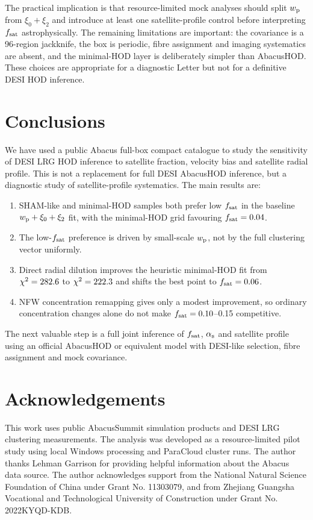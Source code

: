 \documentclass[fleqn,usenatbib]{mnras}
\newcommand{\fsat}{f_{\rm sat}}
\newcommand{\alphas}{\alpha_{\rm s}}
\newcommand{\wproj}{w_{\rm p}}
\newcommand{\xizero}{\xi_0}
\newcommand{\xitwo}{\xi_2}
\begin{document}
The practical implication is that resource-limited mock analyses should split $\wproj$ from $\xizero+\xitwo$ and introduce at least one satellite-profile control before interpreting $\fsat$ astrophysically.  The remaining limitations are important: the covariance is a 96-region jackknife, the box is periodic, fibre assignment and imaging systematics are absent, and the minimal-HOD layer is deliberately simpler than AbacusHOD.  These choices are appropriate for a diagnostic Letter but not for a definitive DESI HOD inference.

\section{Conclusions}
\label{sec:conclusions}

We have used a public Abacus full-box compact catalogue to study the sensitivity of DESI LRG HOD inference to satellite fraction, velocity bias and satellite radial profile.  This is not a replacement for full DESI AbacusHOD inference, but a diagnostic study of satellite-profile systematics.  The main results are:

\begin{enumerate}
  \item SHAM-like and minimal-HOD samples both prefer low $\fsat$ in the baseline $\wproj+\xizero+\xitwo$ fit, with the minimal-HOD grid favouring $\fsat=\BestHODFsat$.
  \item The low-$\fsat$ preference is driven by small-scale $\wproj$, not by the full clustering vector uniformly.
  \item Direct radial dilution improves the heuristic minimal-HOD fit from $\chi^2=282.6$ to $\chi^2=222.3$ and shifts the best point to $\fsat=\BestDilFsat$.
  \item NFW concentration remapping gives only a modest improvement, so ordinary concentration changes alone do not make $\fsat=0.10$--0.15 competitive.
\end{enumerate}

The next valuable step is a full joint inference of $\fsat$, $\alphas$ and satellite profile using an official AbacusHOD or equivalent model with DESI-like selection, fibre assignment and mock covariance.

\section*{Acknowledgements}

This work uses public AbacusSummit simulation products and DESI LRG clustering measurements.  The analysis was developed as a resource-limited pilot study using local Windows processing and ParaCloud cluster runs.  The author thanks Lehman Garrison for providing helpful information about the Abacus data source.  The author acknowledges support from the National Natural Science Foundation of China under Grant No. 11303079, and from Zhejiang Guangsha Vocational and Technological University of Construction under Grant No. 2022KYQD-KDB.
\end{document}
